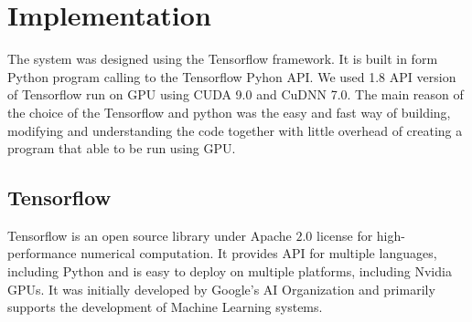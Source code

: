 
\section{Implementation}

The system was designed using the Tensorflow framework. 
It is built in form Python program calling to the Tensorflow Pyhon API.
We used 1.8 API version of Tensorflow run on GPU using CUDA 9.0 and CuDNN 7.0.
The main reason of the choice of the Tensorflow and python was the easy and fast way of building, modifying and understanding the code together with little overhead of
creating a program that able to be run using GPU. 
\medskip

\subsection{Tensorflow}

Tensorflow is an open source library under Apache $2.0$ license for high-performance numerical computation\cite{tensorflow_main}.
It provides API for multiple languages, including Python and is easy to deploy on multiple platforms, including Nvidia GPUs.
It was initially developed by Google's AI Organization and primarily supports the development of Machine Learning systems.
\medskip

